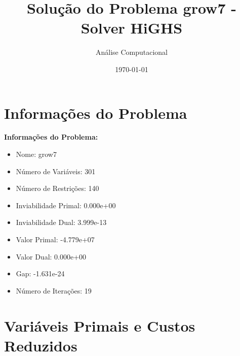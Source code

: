 \documentclass[12pt]{article}
\title{Solução do Problema grow7 - Solver HiGHS}
\author{Análise Computacional}
\date{\today}
\begin{document}
\maketitle

\section{Informações do Problema}

\textbf{Informações do Problema:}
\begin{itemize}
\item Nome: grow7
\item Número de Variáveis: 301
\item Número de Restrições: 140
\item Inviabilidade Primal: 0.000e+00
\item Inviabilidade Dual: 3.999e-13
\item Valor Primal: -4.779e+07
\item Valor Dual: 0.000e+00
\item Gap: -1.631e-24
\item Número de Iterações: 19
\end{itemize}


\section{Variáveis Primais e Custos Reduzidos}
\end{document}
